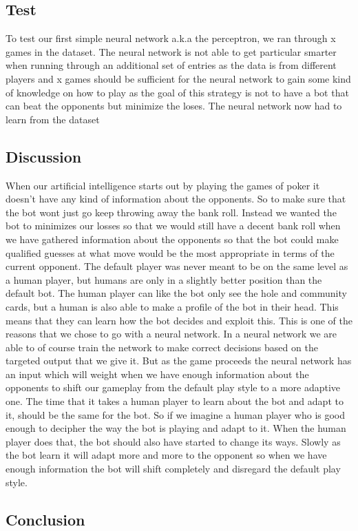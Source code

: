 

\subsection{Test}
To test our first simple neural network a.k.a the perceptron, we ran through x games in the dataset. The neural network is not able to get particular smarter when running through an additional set of entries as the data is from different players and x games should be sufficient for the neural network to gain some kind of knowledge on how to play as the goal of this strategy is not to have a bot that can beat the opponents but minimize the loses.
The neural network now had to learn from the dataset 

\subsection{Discussion}
When our artificial intelligence starts out by playing the games of poker it doesn't have any kind of information about the opponents. So to make sure that the bot wont just go keep throwing away the bank roll. Instead we wanted the bot to minimizes our losses so that we would still have a decent bank roll when we have gathered information about the opponents so that the bot could make qualified guesses at what move would be the most appropriate in terms of the current opponent. The default player was never meant to be on the same level as a human player, but humans are only in a slightly better position than the default bot. The human player can like the bot only see the hole and community cards, but a human is also able to make a profile of the bot in their head. This means that they can learn how the bot decides and exploit this. 
This is one of the reasons that we chose to go with a neural network. In a neural network we are able to of course train the network to make correct decisions based on the targeted output that we give it.
But as the game proceeds the neural network has an input which will weight when we have enough information about the opponents to shift our gameplay from the default play style to a more adaptive one.
The time that it takes a human player to learn about the bot and adapt to it, should be the same for the bot. So if we imagine a human player who is good enough to decipher the way the bot is playing and adapt to it. When the human player does that, the bot should also have started to change its ways. Slowly as the bot learn it will adapt more and more to the opponent so when we have enough information the bot will shift completely and disregard the default play style.
\subsection{Conclusion}